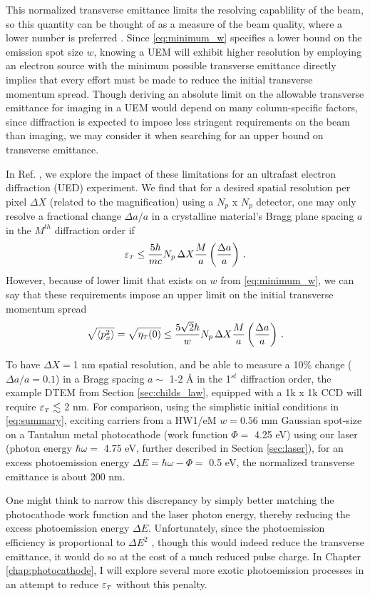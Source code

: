 This normalized transverse emittance limits the resolving capablility of the beam, so this quantity can be thought of as a measure of the beam quality, where a lower number is preferred \cite{berger_dc_2009}.
Since \ref{eq:minimum_w} specifies a lower bound on the emission spot size $w$, knowing a UEM will exhibit higher resolution by employing an electron source with the minimum possible transverse emittance directly implies that every effort must be made to reduce the initial transverse momentum spread.
Though deriving an absolute limit on the allowable transverse emittance for imaging in a UEM would depend on many column-specific factors, since diffraction is expected to impose less stringent requirements on the beam than imaging, we may consider it when searching for an upper bound on transverse emittance.

In Ref. \cite{berger_dc_2009}, we explore the impact of these limitations for an ultrafast electron diffraction (UED) experiment.
We find that for a desired spatial resolution per pixel $\Delta X$ (related to the magnification) using a $N_p$ x $N_p$ detector, one may only resolve a fractional change $\Delta a / a$ in a crystalline material's Bragg plane spacing $a$ in the $M^{th}$ diffraction order if
\begin{equation}
  \varepsilon_{{\scriptscriptstyle T}} \le \frac{5 \hbar}{m c} N_p \, \Delta X \frac{M}{a} \left ( \frac{\Delta a}{a} \right ) \,\text{.}
\end{equation}
However, because of lower limit that exists on $w$ from \ref{eq:minimum_w}, we can say that these requirements impose an upper limit on the initial transverse momentum spread
\begin{equation}
  \sqrt{ \left < p_x^2 \right > } = \sqrt{ \eta_{{\scriptscriptstyle T}} (0) } \le \frac{5\sqrt{2} \hbar}{w} N_p \, \Delta X \frac{M}{a} \left ( \frac{\Delta a}{a} \right ) \,\text{.}
\end{equation}

To have $\Delta X = $1 nm spatial resolution, and be able to measure a 10\% change ($\Delta a / a = 0.1$) in a Bragg spacing $a \sim$ 1-2 \AA{} in the 1$^{st}$ diffraction order, the example DTEM from Section \ref{sec:childs_law}, equipped with a 1k x 1k CCD will require $\varepsilon_{{\scriptscriptstyle T}} \lesssim$ 2 nm.
For comparison, using the simplistic initial conditions in \ref{eq:summary}, exciting carriers from a HW1/eM $w = 0.56 \text{ mm}$ Gaussian spot-size on a Tantalum metal photocathode (work function $\Phi =$ 4.25 eV) using our laser (photon energy $\hbar \omega =$ 4.75 eV, further described in Section \ref{sec:laser}), for an excess photoemission energy $\Delta E = \hbar \omega - \Phi =$ 0.5 eV, the normalized transverse emittance is about 200 nm.

One might think to narrow this discrepancy by simply better matching the photocathode work function and the laser photon energy, thereby reducing the excess photoemission energy $\Delta E$.
Unfortunately, since the photoemission efficiency is proportional to $\Delta E^2$ \cite{shalaev_electron_1994}, though this would indeed reduce the transverse emittance, it would do so at the cost of a much reduced pulse charge.
In Chapter \ref{chap:photocathode}, I will explore several more exotic photoemission processes in an attempt to reduce $\varepsilon_{{\scriptscriptstyle T}}$ without this penalty.
